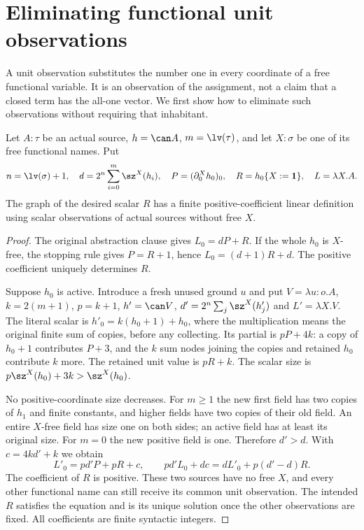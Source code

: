 \section{Eliminating functional unit observations}\label{sec:units}

A unit observation substitutes the number one in every coordinate of a free
functional variable.  It is an observation of the assignment, not a claim
that a closed term has the all-one vector.  We first show how to eliminate
such observations without requiring that inhabitant.

\begin{lemma}\label{lem:one-unit}
Let $A:\tau$ be an actual source, $h=\can A$, $m=\lv(\tau)$, and let
$X:\sigma$ be one of its free functional names.  Put
\[
 n=\lv(\sigma)+1,\quad d=2^n\sum_{i=0}^m\sz^X(h_i),\quad
 P=(\partial^X_0h_0)_0,\quad R=h_0\{X:=\mathbf1\},\quad L=\lambda X.A.
\]
The graph of the desired scalar $R$ has a finite positive-coefficient linear
definition using scalar observations of actual sources without free $X$.
\end{lemma}
\begin{proof}
The original abstraction clause gives $L_0=dP+R$.  If the whole $h_0$ is
$X$-free, the stopping rule gives $P=R+1$, hence
$L_0=(d+1)R+d$.  The positive coefficient uniquely determines $R$.

Suppose $h_0$ is active.  Introduce a fresh unused ground $u$ and put
$V=\lambda u:o.A$, $k=2(m+1)$, $p=k+1$, $h'=\can V$,
$d'=2^n\sum_j\sz^X(h'_j)$ and $L'=\lambda X.V$.
The literal scalar is $h'_0=k(h_0+1)+h_0$, where the multiplication means
the original finite sum of copies, before any collecting.  Its partial is
$pP+4k$: a copy of $h_0+1$ contributes $P+3$, and the $k$ sum nodes
joining the copies and retained $h_0$ contribute $k$ more.  The retained
unit value is $pR+k$.  The scalar size is
$p\sz^X(h_0)+3k>\sz^X(h_0)$.

No positive-coordinate size decreases.  For $m\ge1$ the new first field
has two copies of $h_1$ and finite constants, and higher fields have two
copies of their old field.  An entire $X$-free field has size one on both
sides; an active field has at least its original size.  For $m=0$ the new
positive field is one.  Therefore $d'>d$.  With $c=4kd'+k$ we obtain
\[
 L'_0=pd'P+pR+c,\qquad
 pd'L_0+dc=dL'_0+p(d'-d)R.
\]
The coefficient of $R$ is positive.  These two sources have no free $X$,
and every other functional name can still receive its common unit observation.
The intended $R$ satisfies the equation and is its unique solution once the
other observations are fixed.  All coefficients are finite syntactic integers.
\end{proof}

